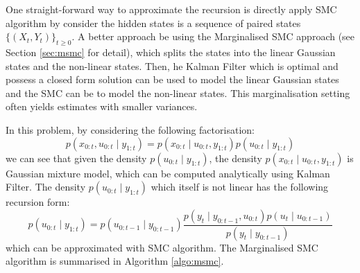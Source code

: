  
 
One straight-forward way to approximate the recursion is directly apply SMC algorithm by consider the hidden states is a sequence of paired states $\{(X_t, Y_t)\}_{t \geq 0}$. A better approach be using the Marginalised SMC approach (see Section \ref{sec:msmc} for detail), which splits the states into the linear Gaussian states and the non-linear states. Then, he Kalman Filter which is optimal and possess a closed form solution can be used to model the linear Gaussian states and the SMC can be to model the non-linear states. This marginalisation setting often yields estimates with smaller variances.

In this problem, by considering the following factorisation:
\begin{equation}
  p(x_{0:t}, u_{0:t} \mid y_{1:t}) = p(x_{0:t} \mid u_{0:t}, y_{1:t}) p(u_{0:t} \mid y_{1:t})
\end{equation}
we can see that given the density $p(u_{0:t} \mid y_{1:t})$, the density $p(x_{0:t} \mid u_{0:t}, y_{1:t})$ is Gaussian mixture model, which can be computed analytically using Kalman Filter. The density $p(u_{0:t} \mid y_{1:t})$ which itself is not linear has the following recursion form:
\begin{equation}
  p(u_{0:t} \mid y_{1:t}) = p(u_{0:t-1} \mid y_{0:t-1 })  \frac{p(y_t \mid y_{0:t-1}, u_{0:t}) p(u_{t} \mid u_{0:t-1})}{p(y_{t} \mid y_{0:t-1})} 
\end{equation}
which can be approximated with SMC algorithm. The Marginalised SMC algorithm is summarised in Algorithm \ref{algo:msmc}.
 
